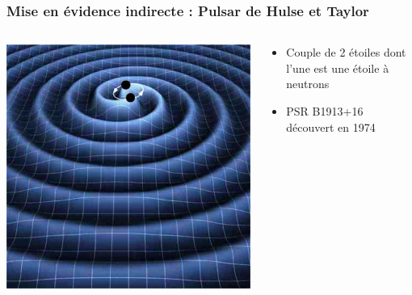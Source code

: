 \documentclass{beamer}
\begin{document}
\begin{frame}
	\frametitle{Mise en évidence indirecte : Pulsar de Hulse et Taylor}
	\begin{columns}
	\begin{column}{0.5\textwidth}
		\includegraphics[scale=0.2]{Docs/pulsar_binaire.jpeg}
	\end{column}
	\begin{column}{0.5\textwidth}
	\begin{itemize}
		\item Couple de 2 étoiles dont l'une est une étoile à neutrons
		\item PSR B1913+16 découvert en 1974
	\end{itemize}
	\end{column}
	\end{columns}
\end{frame}
\end{document}
